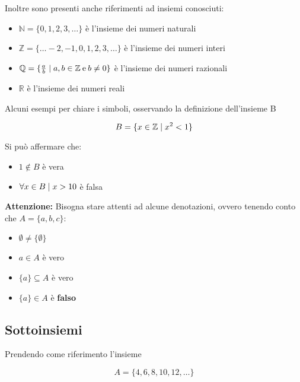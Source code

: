 \documentclass[12pt,a4paper]{article}
\newcommand{\Setsuchthat}{\;\ifnum\currentgrouptype=16 \middle\fi|\;} %
\begin{document}
  Inoltre sono presenti anche riferimenti ad insiemi conosciuti:

  \begin{itemize}
    \item $ \mathbb{N} = \{0, 1, 2, 3, \ldots\} $ è l'insieme dei numeri naturali
    \item $ \mathbb{Z} = \{ \ldots -2, -1, 0, 1, 2, 3, \ldots\} $ è l'insieme dei numeri interi
      \item $ \mathbb{Q}  = \{\frac{a}{b} \Setsuchthat a,b \in \mathbb{Z}\:\text{e}\:b \neq 0\} $ è l'insieme dei numeri razionali
      \item $ \mathbb{R} $ è l'insieme dei numeri reali
  \end{itemize}

  Alcuni esempi per chiare i simboli, osservando la definizione dell'insieme B

  \begin{equation}
    B = \{x \in \mathbb{Z} \Setsuchthat x^{2} < 1\}
  \end{equation}

  Si può affermare che:
  \begin{itemize}
    \item $ 1 \notin B $ è vera
    \item $ \forall x \in B \Setsuchthat x > 10 $ è falsa
    \\[\baselineskip]
  \end{itemize}

  \textbf{Attenzione:} Bisogna stare attenti ad alcune denotazioni, ovvero tenendo conto che $ A = \{a, b, c\} $:

  \begin{itemize}
    \item $ \emptyset \neq \{\emptyset\} $
    \item $ a \in A $ è vero
    \item $ \{a\} \subseteq A $ è vero
    \item $ \{a\} \in A $ è \textbf{falso}
  \end{itemize}

  \subsection{Sottoinsiemi}
  Prendendo come riferimento l'insieme

  \begin{equation}
    A = \{4, 6, 8, 10, 12, \ldots\}
  \end{equation}
\end{document}
